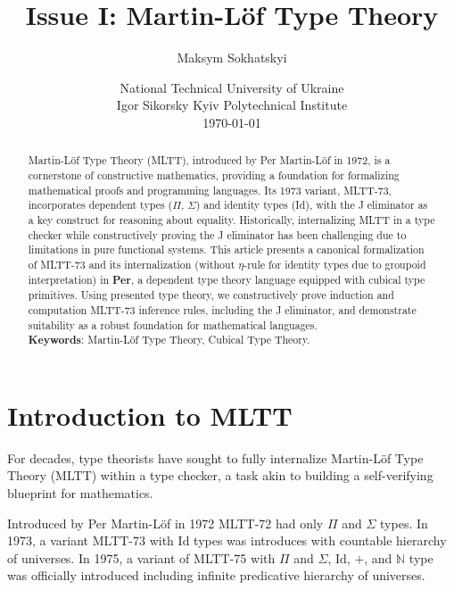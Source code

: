 \documentclass{article}
\begin{document}
\title  { Issue I: Martin-Löf Type Theory }
\author { Maksym Sokhatskyi }
\date   { National Technical University of Ukraine   \\ \small
          Igor Sikorsky Kyiv Polytechnical Institute \\ \today }

\maketitle

\begin{abstract}
Martin-Löf Type Theory (MLTT), introduced by Per Martin-Löf in 1972,
is a cornerstone of constructive mathematics, providing a foundation
for formalizing mathematical proofs and programming languages.
Its 1973 variant, MLTT-73, incorporates dependent types ($\Pi$, $\Sigma$)
and identity types (Id), with the J eliminator as a key construct for reasoning about equality.
Historically, internalizing MLTT in a type checker while constructively
proving the J eliminator has been challenging due to limitations in pure
functional systems. This article presents a canonical formalization of
MLTT-73 and its internalization (without $\eta$-rule for identity types due to groupoid interpretation)
in \textbf{Per}, a dependent type theory language equipped with cubical type primitives.
Using presented type theory, we constructively prove induction and computation MLTT-73 inference rules,
including the J eliminator, and demonstrate suitability as a robust foundation for mathematical languages. \\
\indent \textbf{Keywords}: Martin-Löf Type Theory, Cubical Type Theory.
\end{abstract}

\ifincludeTOC
  \tableofcontents
\fi

\newpage
\section*{Introduction to MLTT}

For decades, type theorists have sought to fully internalize
Martin-Löf Type Theory (MLTT) within a type checker, a task
akin to building a self-verifying blueprint for mathematics.

Introduced by Per Martin-Löf in 1972 \cite{Lof72} MLTT-72 had only $\Pi$ and $\Sigma$ types.
In 1973, a variant MLTT-73 with $\mathrm{Id}$ types was introduces with countable hierarchy of universes.
In 1975, a variant of MLTT-75 with $\Pi$ and $\Sigma$, $\mathrm{Id}$, $+$, and $\mathbb{N}$ type
was officially introduced \cite{Lof75} including infinite predicative hierarchy of universes.
\end{document}
